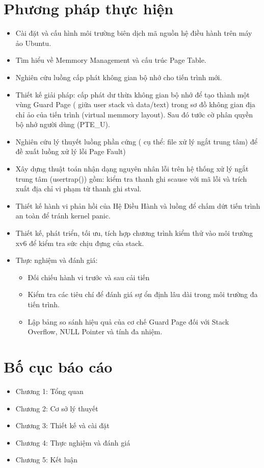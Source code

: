 \section{Phương pháp thực hiện}
\begin{itemize}
    \item Cài đặt và cấu hình môi trường biên dịch mã nguồn hệ điều hành trên máy ảo Ubuntu.
    \item Tìm hiểu về Memmory Management và cấu trúc Page Table.
    \item Nghiên cứu luồng cấp phát không gian bộ nhớ cho tiến trình mới. 
    \item Thiết kế giải pháp: cấp phát dư thừa không gian bộ nhớ để tạo thành một vùng  Guard Page ( giữa user stack và data/text) trong sơ đồ không gian địa chỉ ảo của tiến trình (virtual memmory layout). Sau đó tước cờ phân quyền bộ nhớ người dùng (PTE\_U). 
    \item Nghiên cứu lý thuyết luồng phần cứng ( cụ thể: file xử lý ngắt trung tâm) để đề xuất luồng xử lý lỗi Page Fault)
    \item Xây dựng thuật toán nhận dạng nguyên nhân lỗi trên hệ thống xử lý ngắt trung tâm (usertrap()) gồm: kiểm tra thanh ghi scause với mã lỗi và trích xuất địa chỉ vi phạm từ thanh ghi stval.
    \item Thiết kế hành vi phản hồi của Hệ Điều Hành và luồng để chấm dứt tiến trình an toàn để tránh kernel panic. 
    \item Thiết kế, phát triển, tối ưu, tích hợp chương trình kiểm thử vào môi trường xv6 để kiểm tra sức chịu đựng của stack.
    \item Thực nghiệm và đánh giá: 
    \begin{itemize}
        \item Đối chiếu hành vi trước và sau cải tiến 
        \item Kiểm tra các tiêu chí để đánh giá sự ổn định lâu dài trong môi trường đa tiến trình.
        \item Lập bảng so sánh hiệu quả của cơ chế Guard Page đối với Stack Overflow, NULL Pointer và tính đa nhiệm. 
    \end{itemize}
\end{itemize}
\section{Bố cục báo cáo}
\begin{itemize}
    \item Chương 1: Tổng quan
    \item Chương 2: Cơ sở lý thuyết
    \item Chương 3: Thiết kế và cài đặt
    \item Chương 4: Thực nghiệm và đánh giá
    \item Chương 5: Kết luận 
\end{itemize}